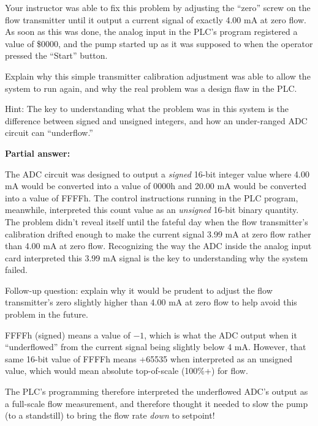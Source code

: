 Your instructor was able to fix this problem by adjusting the ``zero'' screw on the flow transmitter until it output a current signal of exactly 4.00 mA at zero flow.  As soon as this was done, the analog input in the PLC's program registered a value of \$0000, and the pump started up as it was supposed to when the operator pressed the ``Start'' button. 

\vskip 10pt

Explain why this simple transmitter calibration adjustment was able to allow the system to run again, and why the real problem was a design flaw in the PLC.

Hint: The key to understanding what the problem was in this system is the difference between signed and unsigned integers, and how an under-ranged ADC circuit can ``underflow.''







\noindent
{\bf Partial answer:}

\vskip 10pt

The ADC circuit was designed to output a {\it signed} 16-bit integer value where 4.00 mA would be converted into a value of 0000h and 20.00 mA would be converted into a value of FFFFh.  The control instructions running in the PLC program, meanwhile, interpreted this count value as an {\it unsigned} 16-bit binary quantity.  The problem didn't reveal itself until the fateful day when the flow transmitter's calibration drifted enough to make the current signal 3.99 mA at zero flow rather than 4.00 mA at zero flow.  Recognizing the way the ADC inside the analog input card interpreted this 3.99 mA signal is the key to understanding why the system failed.

\vskip 10pt

Follow-up question: explain why it would be prudent to adjust the flow transmitter's zero slightly higher than 4.00 mA at zero flow to help avoid this problem in the future.







FFFFh (signed) means a value of $-1$, which is what the ADC output when it ``underflowed'' from the current signal being slightly below 4 mA.  However, that same 16-bit value of FFFFh means +65535 when interpreted as an unsigned value, which would mean absolute top-of-scale (100\%+) for flow.  

The PLC's programming therefore interpreted the underflowed ADC's output as a full-scale flow measurement, and therefore thought it needed to slow the pump (to a standstill) to bring the flow rate {\it down} to setpoint!



